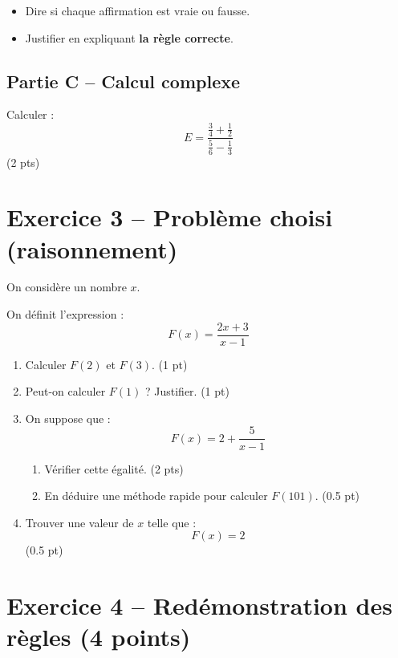 \documentclass[11pt,a4paper]{article}
\begin{document}
\begin{itemize}
\item Dire si chaque affirmation est vraie ou fausse.
\item Justifier en expliquant \textbf{la règle correcte}.
\end{itemize}

\subsection*{Partie C -- Calcul complexe}

Calculer :
\[
E = \frac{\frac{3}{4} + \frac{1}{2}}{\frac{5}{6} - \frac{1}{3}}
\] \hfill (2 pts)

\vspace{0.5cm}

\section*{Exercice 3 -- Problème choisi (raisonnement)}

On considère un nombre $x$.

On définit l’expression :
\[
F(x) = \frac{2x + 3}{x - 1}
\]

\begin{enumerate}
\item Calculer $F(2)$ et $F(3)$. \hfill (1 pt)

\item Peut-on calculer $F(1)$ ? Justifier. \hfill (1 pt)

\item On suppose que :
\[
F(x) = 2 + \frac{5}{x - 1}
\]

\begin{enumerate}
\item Vérifier cette égalité. \hfill (2 pts)
\item En déduire une méthode rapide pour calculer $F(101)$. \hfill (0.5 pt)
\end{enumerate}

\item Trouver une valeur de $x$ telle que :
\[
F(x) = 2
\] \hfill (0.5 pt)

\end{enumerate}

\vspace{1cm}

\section*{Exercice 4 -- Redémonstration des règles (4 points)}
\end{document}
